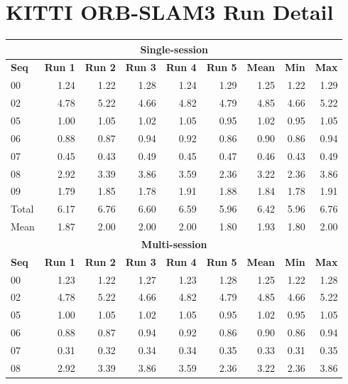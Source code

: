 \clearpage
\section{KITTI ORB-SLAM3 Run Detail}
\label{sec:appendix-kitti-runs}

\begin{table}[htb]
  \centering
  \scriptsize
  \begin{tabular*}{\textwidth}{@{\extracolsep{\fill}} lrrrrrrrr}
  \hline
  \multicolumn{9}{c}{\textbf{Single-session}} \\
  \hline
  \textbf{Seq} & \textbf{Run 1} & \textbf{Run 2} & \textbf{Run 3} & \textbf{Run 4} & \textbf{Run 5} & \textbf{Mean} & \textbf{Min} & \textbf{Max} \\
  \hline
  00 & 1.24 & 1.22 & 1.28 & 1.24 & 1.29 & 1.25 & 1.22 & 1.29 \\
  02 & 4.78 & 5.22 & 4.66 & 4.82 & 4.79 & 4.85 & 4.66 & 5.22 \\
  05 & 1.00 & 1.05 & 1.02 & 1.05 & 0.95 & 1.02 & 0.95 & 1.05 \\
  06 & 0.88 & 0.87 & 0.94 & 0.92 & 0.86 & 0.90 & 0.86 & 0.94 \\
  07 & 0.45 & 0.43 & 0.49 & 0.45 & 0.47 & 0.46 & 0.43 & 0.49 \\
  08 & 2.92 & 3.39 & 3.86 & 3.59 & 2.36 & 3.22 & 2.36 & 3.86 \\
  09 & 1.79 & 1.85 & 1.78 & 1.91 & 1.88 & 1.84 & 1.78 & 1.91 \\
  \hline
  Total & 6.17 & 6.76 & 6.60 & 6.59 & 5.96 & 6.42 & 5.96 & 6.76 \\
  Mean & 1.87 & 2.00 & 2.00 & 2.00 & 1.80 & 1.93 & 1.80 & 2.00 \\
  \hline
  \multicolumn{9}{c}{\textbf{Multi-session}} \\
  \hline
  \textbf{Seq} & \textbf{Run 1} & \textbf{Run 2} & \textbf{Run 3} & \textbf{Run 4} & \textbf{Run 5} & \textbf{Mean} & \textbf{Min} & \textbf{Max} \\
  \hline
  00 & 1.23 & 1.22 & 1.27 & 1.23 & 1.28 & 1.25 & 1.22 & 1.28 \\
  02 & 4.78 & 5.22 & 4.66 & 4.82 & 4.79 & 4.85 & 4.66 & 5.22 \\
  05 & 1.00 & 1.05 & 1.02 & 1.05 & 0.95 & 1.02 & 0.95 & 1.05 \\
  06 & 0.88 & 0.87 & 0.94 & 0.92 & 0.86 & 0.90 & 0.86 & 0.94 \\
  07 & 0.31 & 0.32 & 0.34 & 0.34 & 0.35 & 0.33 & 0.31 & 0.35 \\
  08 & 2.92 & 3.39 & 3.86 & 3.59 & 2.36 & 3.22 & 2.36 & 3.86 \\

\end{tabular*}
\end{table}
